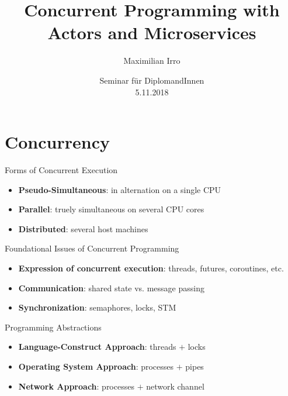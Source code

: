 \documentclass{beamer}
\title[Your Short Title]{Concurrent Programming with\\Actors and Microservices}
\author{Maximilian Irro}
\date{Seminar für DiplomandInnen\\5.11.2018}
\begin{document}
\begin{frame}
  \titlepage
\end{frame}



\section{Concurrency}



\begin{frame}{Forms of Concurrent Execution}

\begin{itemize}
  \pause
  \item \textbf{Pseudo-Simultaneous}: in alternation on a single CPU
  \pause
  \item \textbf{Parallel}: truely simultaneous on several CPU cores
  \pause
  \item \textbf{Distributed}: several host machines
\end{itemize}

\end{frame}


\begin{frame}{Foundational Issues of Concurrent Programming}

\begin{itemize}
  \item \textbf{Expression of concurrent execution}: threads, futures, coroutines, etc.
  \item \textbf{Communication}: shared state vs. message passing
  \item \textbf{Synchronization}: semaphores, locks, STM
\end{itemize}

\end{frame}


\begin{frame}{Programming Abstractions}

\begin{itemize}
  \item \textbf{Language-Construct Approach}: threads $+$ locks
  \pause
  \item \textbf{Operating System Approach}: processes $+$ pipes
  \pause
  \item \textbf{Network Approach}: processes $+$ network channel
\end{itemize}

\end{frame}
\end{document}
